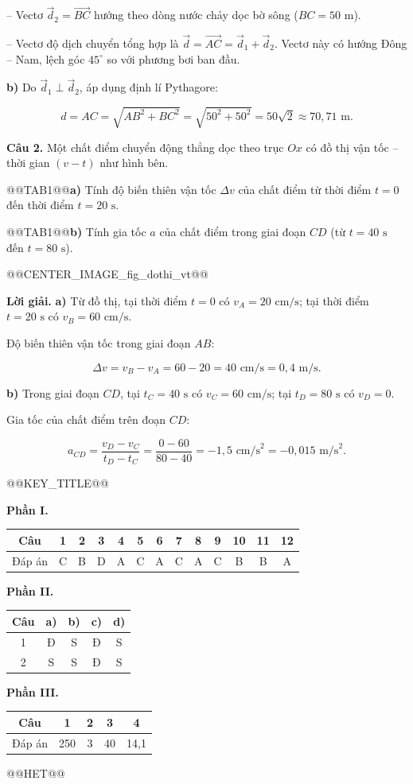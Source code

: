 \documentclass{article}
\begin{document}
-- Vectơ $\vec{d}_2 = \vec{BC}$ hướng theo dòng nước chảy dọc bờ sông ($BC = 50\text{ m}$).

-- Vectơ độ dịch chuyển tổng hợp là $\vec{d} = \vec{AC} = \vec{d}_1 + \vec{d}_2$. Vectơ này có hướng Đông -- Nam, lệch góc $45^\circ$ so với phương bơi ban đầu.

\textbf{b)} Do $\vec{d}_1 \perp \vec{d}_2$, áp dụng định lí Pythagore:

\[d = AC = \sqrt{AB^2 + BC^2} = \sqrt{50^2 + 50^2} = 50\sqrt{2} \approx 70{,}71\text{ m}.\]

\textbf{Câu 2.} Một chất điểm chuyển động thẳng dọc theo trục $Ox$ có đồ thị vận tốc -- thời gian $(v - t)$ như hình bên.

@@TAB1@@\textbf{a)} Tính độ biến thiên vận tốc $\Delta v$ của chất điểm từ thời điểm $t = 0$ đến thời điểm $t = 20\text{ s}$.

@@TAB1@@\textbf{b)} Tính gia tốc $a$ của chất điểm trong giai đoạn $CD$ (từ $t = 40\text{ s}$ đến $t = 80\text{ s}$).

@@CENTER_IMAGE_fig_dothi_vt@@

\textbf{Lời giải.} \textbf{a)} Từ đồ thị, tại thời điểm $t = 0$ có $v_A = 20\text{ cm/s}$; tại thời điểm $t = 20\text{ s}$ có $v_B = 60\text{ cm/s}$.

Độ biến thiên vận tốc trong giai đoạn $AB$:

\[\Delta v = v_B - v_A = 60 - 20 = 40\text{ cm/s} = 0{,}4\text{ m/s}.\]

\textbf{b)} Trong giai đoạn $CD$, tại $t_C = 40\text{ s}$ có $v_C = 60\text{ cm/s}$; tại $t_D = 80\text{ s}$ có $v_D = 0$.

Gia tốc của chất điểm trên đoạn $CD$:

\[a_{CD} = \frac{v_D - v_C}{t_D - t_C} = \frac{0 - 60}{80 - 40} = -1{,}5\text{ cm/s}^2 = -0{,}015\text{ m/s}^2.\]



@@KEY_TITLE@@

\textbf{Phần I.}

\begin{tabular}{|c|c|c|c|c|c|c|c|c|c|c|c|c|}\hline
Câu & 1 & 2 & 3 & 4 & 5 & 6 & 7 & 8 & 9 & 10 & 11 & 12 \\ \hline
Đáp án & C & B & D & A & C & A & C & A & C & B & B & A \\ \hline
\end{tabular}

\textbf{Phần II.}

\begin{tabular}{|c|c|c|c|c|}\hline
Câu & a) & b) & c) & d) \\ \hline
1 & Đ & S & Đ & S \\ \hline
2 & S & S & Đ & S \\ \hline
\end{tabular}

\textbf{Phần III.}

\begin{tabular}{|c|c|c|c|c|}\hline
Câu & 1 & 2 & 3 & 4 \\ \hline
Đáp án & 250 & 3 & 40 & 14,1 \\ \hline
\end{tabular}



@@HET@@
\end{document}
